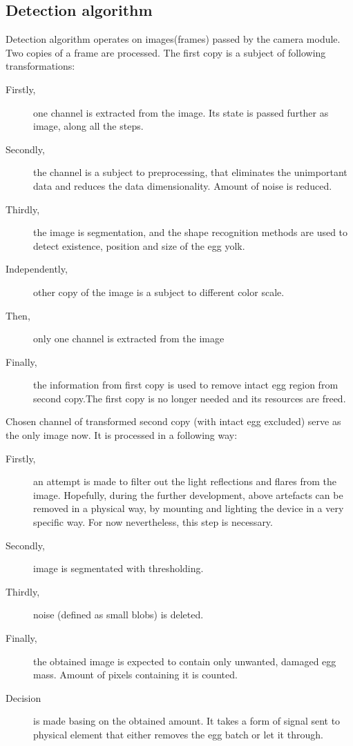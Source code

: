 \documentclass[12pt,twoside,a4paper]{article}
\begin{document}
\subsection{Detection algorithm}
Detection algorithm operates on images(frames) passed by the camera module.
Two copies of a frame are processed. The first copy is a subject of following transformations:
\begin{description}
  \item[Firstly,]one channel is extracted from the image.
  Its state is passed further as image, along all the steps.
  \item[Secondly,]the channel is a subject to preprocessing, that eliminates the unimportant data and reduces the data dimensionality. 
  Amount of noise is reduced.
  \item[Thirdly,]the image is segmentation, and the shape recognition methods are used to detect existence, position and size of the egg yolk.
  \item[Independently,]other copy of the image is a subject to different color scale.
  \item[Then,]only one channel is extracted from the image
  \item[Finally,]the information from first copy is used to remove intact egg region from second copy.The first copy is no longer needed and its resources are freed.
\end{description}

Chosen channel of transformed second copy (with intact egg excluded) serve as the only image now.
It is processed in a following way:

\begin{description}
  \item[Firstly,]an attempt is made to filter out the light reflections and flares from the image.
  Hopefully, during the further development, above artefacts can be removed in a physical way, by mounting and lighting the device in a very specific way.
  For now nevertheless, this step is necessary.
  \item[Secondly,]image is segmentated with thresholding.
  \item[Thirdly,]noise (defined as small blobs) is deleted.
  \item[Finally,]the obtained image is expected to contain only unwanted, damaged egg mass.
  Amount of pixels containing it is counted.
  \item[Decision] is made basing on the obtained amount.
  It takes a form of signal sent to physical element that either removes the egg batch or let it through.
\end{description}
\end{document}
